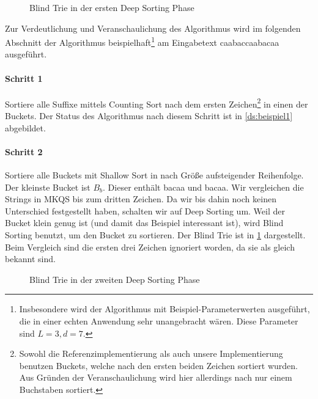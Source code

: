 \newcommand{\tnode}{\node[draw,circle]}
\newcommand{\trans}{\draw[-stealth]}
\begin{figure}[!h]
\centering
{}
\caption{Blind Trie in der ersten Deep Sorting Phase}
\label{ds:beispiel_bt1}
\end{figure}

Zur Verdeutlichung und Veranschaulichung des Algorithmus wird im folgenden Abschnitt der Algorithmus beispielhaft\footnote{Insbesondere wird der Algorithmus mit Beispiel-Parameterwerten ausgeführt, die in einer echten Anwendung sehr unangebracht wären. Diese Parameter sind $L = 3, d = 7$.} am Eingabetext \glqq caabaccaabacaa\grqq{} ausgeführt.

\paragraph{Schritt 1} Sortiere alle Suffixe mittels Counting Sort nach dem ersten Zeichen\footnote{Sowohl die Referenzimplementierung als auch unsere Implementierung benutzen Buckets, welche nach den ersten beiden Zeichen sortiert wurden.
Aus Gründen der Veranschaulichung wird hier allerdings nach nur einem Buchstaben sortiert.} in einen der Buckets.
Der Status des Algorithmus nach diesem Schritt ist in \cref{ds:beispiel1} abgebildet.

\paragraph{Schritt 2} Sortiere alle Buckets mit Shallow Sort in nach Größe aufsteigender Reihenfolge.
Der kleinste Bucket ist $B_b$.
Dieser enthält \glqq bacaa\grqq{} und \glqq bacaa\grqq.
Wir vergleichen die Strings in MKQS bis zum dritten Zeichen.
Da wir bis dahin noch keinen Unterschied festgestellt haben, schalten wir auf Deep Sorting um. 
Weil der Bucket klein genug ist (und damit das Beispiel interessant ist), wird Blind Sorting benutzt, um den Bucket zu sortieren.
Der Blind Trie ist in \cref{ds:beispiel_bt1} dargestellt.
Beim Vergleich sind die ersten drei Zeichen ignoriert worden, da sie als gleich bekannt sind.

\begin{figure}
\centering
{}
\caption{Blind Trie in der zweiten Deep Sorting Phase}
\label{ds:beispiel_bt2}
\end{figure}

